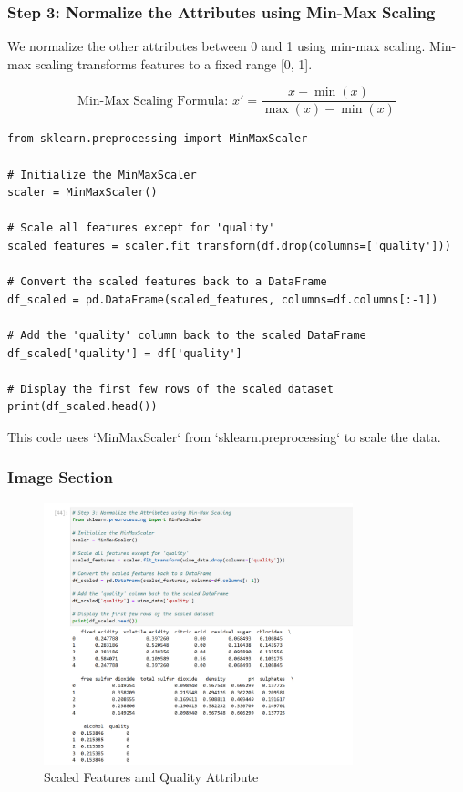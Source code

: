 \documentclass{exam}
\begin{document}
\newpage

\subsubsection{Step 3: Normalize the Attributes using Min-Max Scaling}

We normalize the other attributes between 0 and 1 using min-max scaling. Min-max scaling transforms features to a fixed range [0, 1].

\[
\text{Min-Max Scaling Formula: } x' = \frac{x - \min(x)}{\max(x) - \min(x)}
\]

\begin{verbatim}
from sklearn.preprocessing import MinMaxScaler

# Initialize the MinMaxScaler
scaler = MinMaxScaler()

# Scale all features except for 'quality'
scaled_features = scaler.fit_transform(df.drop(columns=['quality']))

# Convert the scaled features back to a DataFrame
df_scaled = pd.DataFrame(scaled_features, columns=df.columns[:-1])

# Add the 'quality' column back to the scaled DataFrame
df_scaled['quality'] = df['quality']

# Display the first few rows of the scaled dataset
print(df_scaled.head())
\end{verbatim}

This code uses `MinMaxScaler` from `sklearn.preprocessing` to scale the data.

\subsubsection*{Image Section}

\begin{figure}[h!]
    \centering
    \includegraphics[width=0.8\textwidth]{images/wine_scaled_data.png}
    \caption{Scaled Features and Quality Attribute}
    \label{fig:step_3_scaled_data}
\end{figure}
\end{document}
